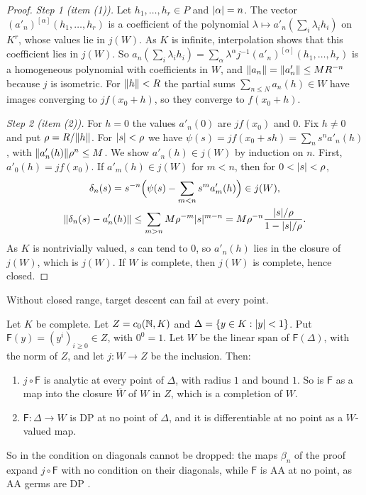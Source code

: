 \begin{proof}
\emph{Step 1 (item (1)).} Let $h_1,\dots,h_r\in P$ and $\lvert \alpha\rvert=n$. The vector $(a'_n)^{[\alpha]}(h_1,\dots,h_r)$ is a coefficient of the polynomial $\lambda\mapsto a'_n(\sum_i\lambda_ih_i)$ on $K^r$, whose values lie in $j(W)$. As $K$ is infinite, interpolation shows that this coefficient lies in $j(W)$. So $a_n(\sum_i\lambda_ih_i)=\sum_\alpha\lambda^\alpha j^{-1}(a'_n)^{[\alpha]}(h_1,\dots,h_r)$ is a homogeneous polynomial with coefficients in $W$, and $\lVert a_n\rVert=\lVert a'_n\rVert\le MR^{-n}$ because $j$ is isometric. For $\lVert h\rVert<R$ the partial sums $\sum_{n\le N}a_n(h)\in W$ have images converging to $jf(x_0+h)$, so they converge to $f(x_0+h)$.

\emph{Step 2 (item (2)).} For $h=0$ the values $a'_n(0)$ are $jf(x_0)$ and $0$. Fix $h\ne0$ and put $\rho=R/\lVert h\rVert$. For $\lvert s\rvert<\rho$ we have $\psi(s)=jf(x_0+sh)=\sum_ns^na'_n(h)$, with $\lVert a'_n(h)\rVert\rho^n\le M$. We show $a'_n(h)\in j(W)$ by induction on $n$. First, $a'_0(h)=jf(x_0)$. If $a'_m(h)\in j(W)$ for $m<n$, then for $0<\lvert s\rvert<\rho$,
\begin{gather*}
 \delta_n(s)=s^{-n}\Bigl(\psi(s)-\sum_{m<n}s^ma'_m(h)\Bigr)\in j(W),\\
 \lVert \delta_n(s)-a'_n(h)\rVert\le\sum_{m>n}M\rho^{-m}\lvert s\rvert^{m-n}=M\rho^{-n}\frac{\lvert s\rvert/\rho}{1-\lvert s\rvert/\rho}.
\end{gather*}
As $K$ is nontrivially valued, $s$ can tend to $0$, so $a'_n(h)$ lies in the closure of $j(W)$, which is $j(W)$. If $W$ is complete, then $j(W)$ is complete, hence closed.
\end{proof}

Without closed range, target descent can fail at every point.

\begin{example}\label{dp:ex:dense-isometry}
Let $K$ be complete. Let $Z=c_0(\mathbb N,K)$ and $\Delta=\{y\in K:\lvert y\rvert<1\}$. Put $\mathsf F(y)=(y^i)_{i\ge0}\in Z$, with $0^0=1$. Let $W$ be the linear span of $\mathsf F(\Delta)$, with the norm of $Z$, and let $j\colon W\to Z$ be the inclusion. Then:
\begin{enumerate}
\item $j\circ\mathsf F$ is analytic at every point of $\Delta$, with radius $1$ and bound $1$. So is $\mathsf F$ as a map into the closure $\overline W$ of $W$ in $Z$, which is a completion of $W$.
\item $\mathsf F\colon\Delta\to W$ is DP at no point of $\Delta$, and it is differentiable at no point as a $W$-valued map.
\end{enumerate}
So in \cite[Definition~14.7]{I} the condition on diagonals cannot be dropped: the maps $\beta_n$ of the proof expand $j\circ\mathsf F$ with no condition on their diagonals, while $\mathsf F$ is AA at no point, as AA germs are DP \cite[Proposition~14.9(1)]{I}.
\end{example}

